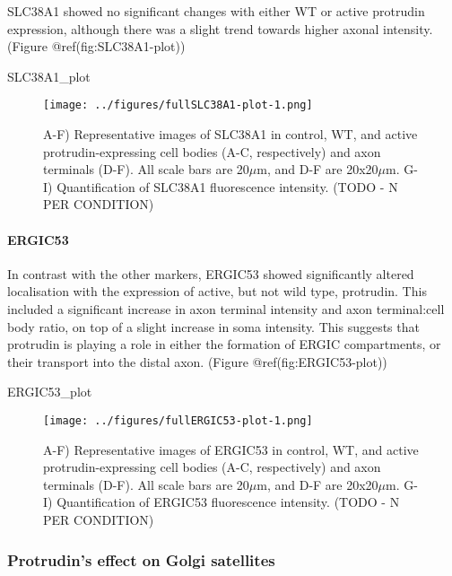 \documentclass[
  12pt,
  a4paper,
]{article}
\newenvironment{Shaded}{\begin{snugshade}}{\end{snugshade}}
\newcommand{\NormalTok}[1]{#1}
\begin{document}
SLC38A1 showed no significant changes with either WT or active protrudin
expression, although there was a slight trend towards higher axonal
intensity. (Figure @ref(fig:SLC38A1-plot))

\begin{Shaded}
\begin{Highlighting}[]
\NormalTok{SLC38A1\_plot}
\end{Highlighting}
\end{Shaded}

\begin{figure}
\centering
\texttt{[image: ../figures/fullSLC38A1-plot-1.png]}
\caption{A-F) Representative images of SLC38A1 in control, WT, and
active protrudin-expressing cell bodies (A-C, respectively) and axon
terminals (D-F). All scale bars are 20\(\mu\)m, and D-F are
20x20\(\mu\)m. G-I) Quantification of SLC38A1 fluorescence intensity.
(TODO - N PER CONDITION)}
\end{figure}

\hypertarget{ergic53}{%
\paragraph{ERGIC53}\label{ergic53}}

In contrast with the other markers, ERGIC53 showed significantly altered
localisation with the expression of active, but not wild type,
protrudin. This included a significant increase in axon terminal
intensity and axon terminal:cell body ratio, on top of a slight increase
in soma intensity. This suggests that protrudin is playing a role in
either the formation of ERGIC compartments, or their transport into the
distal axon. (Figure @ref(fig:ERGIC53-plot))

\begin{Shaded}
\begin{Highlighting}[]
\NormalTok{ERGIC53\_plot}
\end{Highlighting}
\end{Shaded}

\begin{figure}
\centering
\texttt{[image: ../figures/fullERGIC53-plot-1.png]}
\caption{A-F) Representative images of ERGIC53 in control, WT, and
active protrudin-expressing cell bodies (A-C, respectively) and axon
terminals (D-F). All scale bars are 20\(\mu\)m, and D-F are
20x20\(\mu\)m. G-I) Quantification of ERGIC53 fluorescence intensity.
(TODO - N PER CONDITION)}
\end{figure}

\hypertarget{protrudins-effect-on-golgi-satellites}{%
\subsubsection{Protrudin's effect on Golgi
satellites}\label{protrudins-effect-on-golgi-satellites}}
\end{document}
